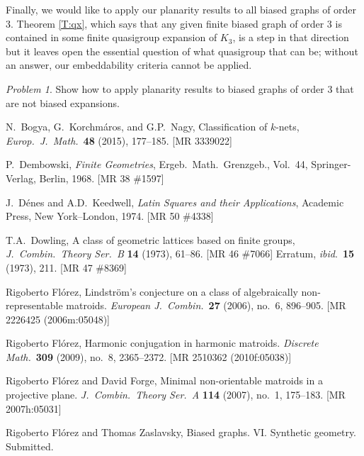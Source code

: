 \documentclass[reqno,12pt]{amsart}
\theoremstyle{remark}
\newtheorem{prob}[thm]{Problem}
\numberwithin{equation}{section}
\numberwithin{figure}{section}
\begin{document}
Finally, we would like to apply our planarity results to all biased graphs of order 3.  
Theorem \ref{T:qx}, which says that any given finite biased graph of order 3 is contained in some finite quasigroup expansion of $K_3$, is a step in that direction but it leaves open the essential question of what quasigroup that can be; without an answer, our embeddability criteria cannot be applied.

\begin{prob}	\label{Pr:bgplanerep}
Show how to apply planarity results to biased graphs of order 3 that are not biased expansions.
\end{prob}




\begin{thebibliography}{99}

 N.\ Bogya, G.\ Korchm\'aros, and G.P.\ Nagy,
Classification of $k$-nets,
\emph{Europ.\ J.\ Math.}\ {\bf 48} (2015), 177--185.
[MR 3339022]

 P.\ Dembowski,
\emph{Finite Geometries},
Ergeb.\ Math.\ Grenzgeb., Vol.\ 44,
Springer-Verlag, Berlin, 1968.
[MR 38 \#1597]  %

 J.~D\'enes and A.D.~Keedwell, 
\emph{Latin Squares and their Applications}, 
Academic Press, New York--London, 1974.
[MR 50 \#4338]  %

 T.A.\ Dowling, 
A class of geometric lattices based on finite groups, 
\emph{J.\ Combin.\ Theory Ser.\ B} {\bf 14} (1973), 61--86.  
[MR 46 \#7066]  
Erratum, 
\emph{ibid}.\ {\bf 15} (1973), 211.  
[MR 47 \#8369]  %

 Rigoberto Fl\'orez, 
Lindstr\"om's conjecture on a class of algebraically non-representable matroids.
\emph{European J.\ Combin.}\ {\bf 27} (2006), no.\ 6, 896--905.
[MR 2226425 (2006m:05048)]  %

 Rigoberto Fl\'orez, 
Harmonic conjugation in harmonic matroids.  
\emph{Discrete Math.}\ {\bf 309} (2009), no.\ 8, 2365--2372.
[MR 2510362 (2010f:05038)]  %

 Rigoberto Fl\'orez and David Forge, 
Minimal non-orientable matroids in a projective plane. 
\emph{J.\ Combin.\ Theory Ser.\ A} {\bf 114} (2007), no.\ 1, 175--183.
[MR 2007h:05031]  %

  Rigoberto Fl\'orez and Thomas Zaslavsky,
Biased graphs.  VI.  Synthetic geometry.
Submitted.


\end{thebibliography}
\end{document}
